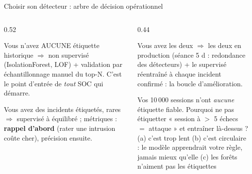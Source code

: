 \begin{frame}{Choisir son détecteur : arbre de décision opérationnel}
\footnotesize%
\begin{columns}[t]
\begin{column}{0.52\textwidth}
\begin{block}{Vous n'avez AUCUNE étiquette historique}
$\Rightarrow$ non supervisé (IsolationForest, LOF) + validation par
échantillonnage manuel du top-N. C'est le point d'entrée de \emph{tout}
SOC qui démarre.
\end{block}
\begin{block}{Vous avez des incidents étiquetés, rares}
$\Rightarrow$ supervisé à  équilibré ; métriques :
\textbf{rappel d'abord} (rater une intrusion coûte cher), précision ensuite.
\end{block}
\end{column}
\begin{column}{0.44\textwidth}
\begin{block}{Vous avez les deux}
$\Rightarrow$ les deux en production (séance 5 d : redondance des
détecteurs) + le supervisé réentraîné à chaque incident confirmé : la
boucle d'amélioration.
\end{block}
\begin{qbox}[Question]
Vos 10\,000 sessions n'ont \emph{aucune} étiquette fiable. Pourquoi ne pas
étiquetter « session à $>$ 5 échecs $=$ attaque » et entraîner là-dessus ?\\
(a) c'est trop lent \quad (b) c'est circulaire : le modèle apprendrait votre
règle, jamais mieux qu'elle \quad (c) les forêts n'aiment pas les étiquettes
\end{qbox}
\end{column}
\end{columns}
\end{frame}

